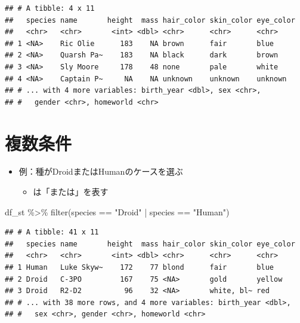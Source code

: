 \documentclass[
  xelatex,ja=standard, b5paper]{bxjsbook}
\newenvironment{Shaded}{\begin{snugshade}}{\end{snugshade}}
\newcommand{\FunctionTok}[1]{\textcolor[rgb]{0.00,0.00,0.00}{#1}}
\newcommand{\NormalTok}[1]{#1}
\newcommand{\SpecialCharTok}[1]{\textcolor[rgb]{0.00,0.00,0.00}{#1}}
\newcommand{\StringTok}[1]{\textcolor[rgb]{0.31,0.60,0.02}{#1}}
\providecommand{\tightlist}{%
  \setlength{\itemsep}{0pt}\setlength{\parskip}{0pt}}
\begin{document}
\begin{verbatim}
## # A tibble: 4 x 11
##   species name       height  mass hair_color skin_color eye_color
##   <chr>   <chr>       <int> <dbl> <chr>      <chr>      <chr>    
## 1 <NA>    Ric Olie      183    NA brown      fair       blue     
## 2 <NA>    Quarsh Pa~    183    NA black      dark       brown    
## 3 <NA>    Sly Moore     178    48 none       pale       white    
## 4 <NA>    Captain P~     NA    NA unknown    unknown    unknown  
## # ... with 4 more variables: birth_year <dbl>, sex <chr>,
## #   gender <chr>, homeworld <chr>
\end{verbatim}

\hypertarget{filter-multi}{%
\section{複数条件}\label{filter-multi}}

\begin{itemize}
\tightlist
\item
  例：種がDroidまたはHumanのケースを選ぶ

  \begin{itemize}
  \tightlist
  \item
    \texttt{\textbar{}}は「または」を表す
  \end{itemize}
\end{itemize}

\begin{Shaded}
\begin{Highlighting}[]
\NormalTok{df\_st }\SpecialCharTok{\%\textgreater{}\%} 
  \FunctionTok{filter}\NormalTok{(species }\SpecialCharTok{==} \StringTok{"Droid"} \SpecialCharTok{|}\NormalTok{ species }\SpecialCharTok{==} \StringTok{"Human"}\NormalTok{)}
\end{Highlighting}
\end{Shaded}

\begin{verbatim}
## # A tibble: 41 x 11
##   species name       height  mass hair_color skin_color eye_color
##   <chr>   <chr>       <int> <dbl> <chr>      <chr>      <chr>    
## 1 Human   Luke Skyw~    172    77 blond      fair       blue     
## 2 Droid   C-3PO         167    75 <NA>       gold       yellow   
## 3 Droid   R2-D2          96    32 <NA>       white, bl~ red      
## # ... with 38 more rows, and 4 more variables: birth_year <dbl>,
## #   sex <chr>, gender <chr>, homeworld <chr>
\end{verbatim}
\end{document}
